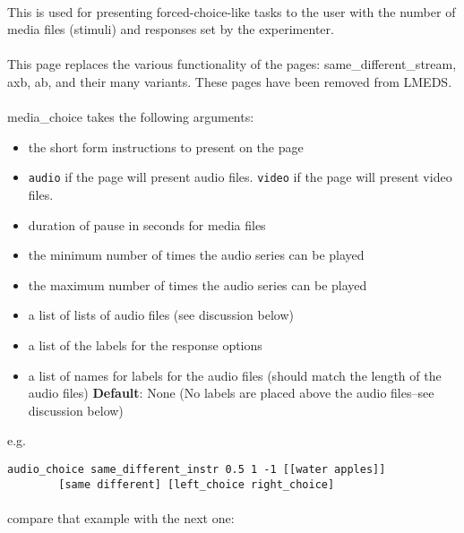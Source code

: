 \paragraph{}
This is used for presenting forced-choice-like tasks to the user with the number of media files (stimuli) and responses set by the experimenter.

\paragraph{}
This page replaces the various functionality of the pages: same\_different\_stream, axb, ab, and their many variants.  These pages have been removed from LMEDS.

\paragraph{}
media\_choice takes the following arguments:

\begin{itemize}
\item the short form instructions to present on the page
\item \texttt{audio} if the page will present audio files.  \texttt{video} if the page will present video files.
\item duration of pause in seconds for media files
\item the minimum number of times the audio series can be played
\item the maximum number of times the audio series can be played
\item a list of lists of audio files (see discussion below)
\item a list of the labels for the response options
\item a list of names for labels for the audio files (should match the length of the audio files) \textbf{Default}: None (No labels are placed above the audio files--see discussion below)
\end{itemize}

e.g.
\begin{lstlisting}
audio_choice same_different_instr 0.5 1 -1 [[water apples]]
		[same different] [left_choice right_choice]
\end{lstlisting}

\paragraph{}
compare that example with the next one:

